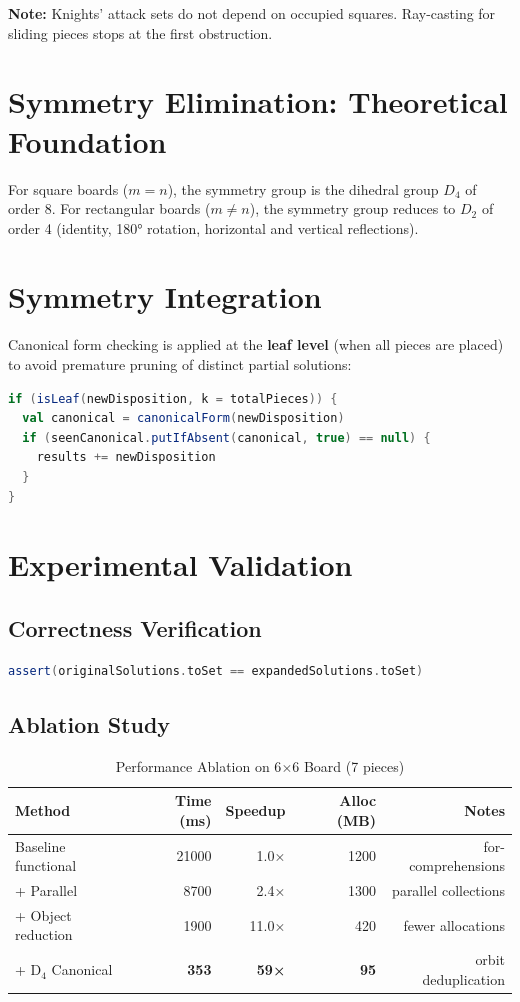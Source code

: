 \documentclass[12pt,a4paper]{article}
\theoremstyle{definition}
\begin{document}
\textbf{Note:} Knights' attack sets do not depend on occupied squares. Ray-casting for sliding pieces stops at the first obstruction.

\section{Symmetry Elimination: Theoretical Foundation}

For square boards ($m = n$), the symmetry group is the dihedral group $D_4$ of order 8. For rectangular boards ($m \neq n$), the symmetry group reduces to $D_2$ of order 4 (identity, 180° rotation, horizontal and vertical reflections).

\section{Symmetry Integration}

Canonical form checking is applied at the \textbf{leaf level} (when all pieces are placed) to avoid premature pruning of distinct partial solutions:

\begin{lstlisting}[language=Scala]
if (isLeaf(newDisposition, k = totalPieces)) {
  val canonical = canonicalForm(newDisposition)
  if (seenCanonical.putIfAbsent(canonical, true) == null) {
    results += newDisposition
  }
}
\end{lstlisting}

\section{Experimental Validation}

\subsection{Correctness Verification}

\begin{lstlisting}[language=Scala]
assert(originalSolutions.toSet == expandedSolutions.toSet)
\end{lstlisting}

\subsection{Ablation Study}

\begin{table}[h]
\centering
\caption{Performance Ablation on 6$\times$6 Board (7 pieces)}
\begin{tabular}{@{}lrrrr@{}}
\toprule
Method & Time (ms) & Speedup & Alloc (MB) & Notes \\
\midrule
Baseline functional & 21000 & 1.0× & 1200 & for-comprehensions \\
+ Parallel          & 8700  & 2.4× & 1300 & parallel collections \\
+ Object reduction  & 1900  & 11.0× & 420 & fewer allocations \\
+ D$_4$ Canonical   & \textbf{353} & \textbf{59×} & \textbf{95} & orbit deduplication \\
\bottomrule
\end{tabular}
\end{table}
\end{document}

